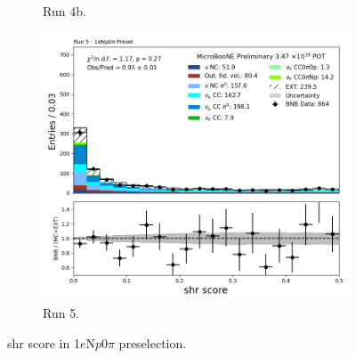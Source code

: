 \begin{figure}[H]
\begin{subfigure}[t]{0.32\linewidth}
        \caption{Run 4b.}
    \end{subfigure}%
    \hspace{0.2cm}%
    \begin{subfigure}[t]{0.32\linewidth}
        \includegraphics[width=\linewidth]{technote/Appendix_Preselection/Figures/1eNp0pi/Run5/shr_score_Run5_1eNp0pi_Presel.png}
        \caption{Run 5.}
    \end{subfigure}
    \caption{shr score in 1$e$N$p$0$\pi$ preselection.}
\end{figure}

